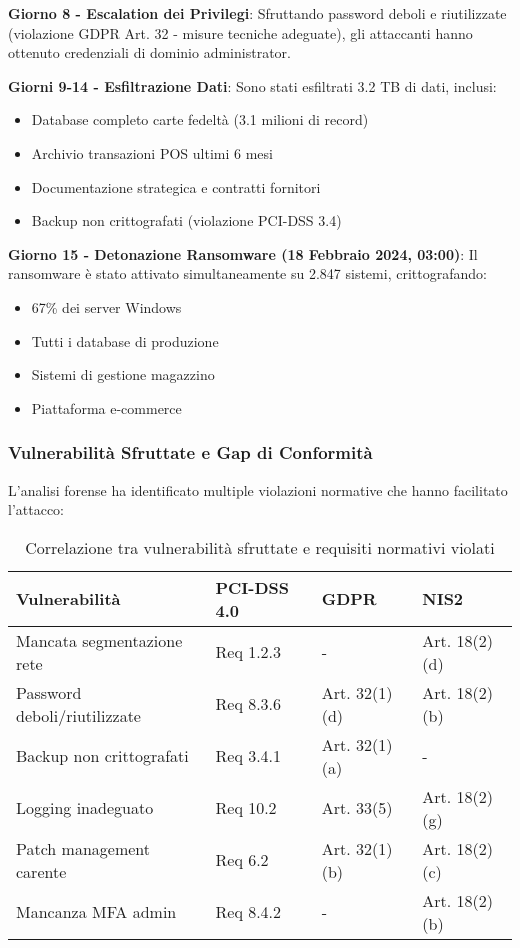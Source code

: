 \textbf{Giorno 8 - Escalation dei Privilegi}:
Sfruttando password deboli e riutilizzate (violazione GDPR Art. 32 - misure tecniche adeguate), gli attaccanti hanno ottenuto credenziali di dominio administrator.

\textbf{Giorni 9-14 - Esfiltrazione Dati}:
Sono stati esfiltrati 3.2 TB di dati, inclusi:
\begin{itemize}
    \item Database completo carte fedeltà (3.1 milioni di record)
    \item Archivio transazioni POS ultimi 6 mesi
    \item Documentazione strategica e contratti fornitori
    \item Backup non crittografati (violazione PCI-DSS 3.4)
\end{itemize}

\textbf{Giorno 15 - Detonazione Ransomware (18 Febbraio 2024, 03:00)}:
Il ransomware è stato attivato simultaneamente su 2.847 sistemi, crittografando:
\begin{itemize}
    \item 67\% dei server Windows
    \item Tutti i database di produzione
    \item Sistemi di gestione magazzino
    \item Piattaforma e-commerce
\end{itemize}

\subsubsection{Vulnerabilità Sfruttate e Gap di Conformità}

L'analisi forense ha identificato multiple violazioni normative che hanno facilitato l'attacco:

\begin{table}[h]
\centering
\caption{Correlazione tra vulnerabilità sfruttate e requisiti normativi violati}
\label{tab:vulnerabilita_requisiti}
\begin{tabular}{|p{4cm}|p{3cm}|p{3cm}|p{3cm}|}
\hline
\textbf{Vulnerabilità} & \textbf{PCI-DSS 4.0} & \textbf{GDPR} & \textbf{NIS2} \\
\hline
Mancata segmentazione rete & Req 1.2.3 & - & Art. 18(2)(d) \\
\hline
Password deboli/riutilizzate & Req 8.3.6 & Art. 32(1)(d) & Art. 18(2)(b) \\
\hline
Backup non crittografati & Req 3.4.1 & Art. 32(1)(a) & - \\
\hline
Logging inadeguato & Req 10.2 & Art. 33(5) & Art. 18(2)(g) \\
\hline
Patch management carente & Req 6.2 & Art. 32(1)(b) & Art. 18(2)(c) \\
\hline
Mancanza MFA admin & Req 8.4.2 & - & Art. 18(2)(b) \\
\hline
\end{tabular}
\end{table}

